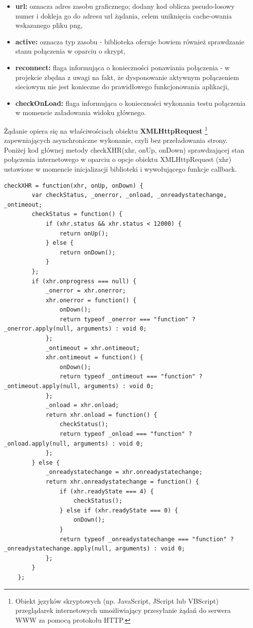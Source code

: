 \begin{itemize}
\item \textbf{url:} oznacza adres zasobu graficznego; dodany kod oblicza pseudo-losowy numer i dokleja go do adresu url żądania, celem uniknięcia cache-owania wskazanego pliku png,
\item \textbf{active:} oznacza typ zasobu - biblioteka oferuje bowiem również sprawdzanie stanu połączenia w oparciu o skrypt,
\item \textbf{reconnect:} flaga informująca o konieczności ponawiania połączenia - w projekcie zbędna z uwagi na fakt, że dysponowanie aktywnym połączeniem sieciowym nie jest konieczne do prawidłowego funkcjonowania aplikacji,
\item \textbf{checkOnLoad:} flaga informująca o konieczności wykonania testu połączenia w momencie załadowania widoku głównego.
\end{itemize}

Żądanie opiera się na właściwościach obiektu \textbf{XMLHttpRequest} \footnote{Obiekt języków skryptowych (np. JavaScript, JScript lub VBScript) przeglądarek internetowych umożliwiający przesyłanie żądań do serwera WWW za pomocą protokołu HTTP.} zapewniających asynchroniczne wykonanie, czyli bez przeładowania strony. Poniżej kod głównej metody checkXHR(xhr, onUp, onDown) sprawdzającej stan połączenia internetowego w oparciu o opcje obiektu XMLHttpRequest (xhr) ustawione w momencie inicjalizacji biblioteki i wywołującego funkcje callback.

\begin{lstlisting}[caption=Metoda checkXHR() wykonująca żądanie AJAX załadowania zasobu graficznego., label=amb, captionpos=b]
	checkXHR = function(xhr, onUp, onDown) {
        var checkStatus, _onerror, _onload, _onreadystatechange, _ontimeout;
        checkStatus = function() {
            if (xhr.status && xhr.status < 12000) {
                return onUp();
            } else {
                return onDown();
            }
        };
        if (xhr.onprogress === null) {
            _onerror = xhr.onerror;
            xhr.onerror = function() {
                onDown();
                return typeof _onerror === "function" ? _onerror.apply(null, arguments) : void 0;
            };
            _ontimeout = xhr.ontimeout;
            xhr.ontimeout = function() {
                onDown();
                return typeof _ontimeout === "function" ? _ontimeout.apply(null, arguments) : void 0;
            };
            _onload = xhr.onload;
            return xhr.onload = function() {
                checkStatus();
                return typeof _onload === "function" ? _onload.apply(null, arguments) : void 0;
            };
        } else {
            _onreadystatechange = xhr.onreadystatechange;
            return xhr.onreadystatechange = function() {
                if (xhr.readyState === 4) {
                    checkStatus();
                } else if (xhr.readyState === 0) {
                    onDown();
                }
                return typeof _onreadystatechange === "function" ? _onreadystatechange.apply(null, arguments) : void 0;
            };
        }
    };
\end{lstlisting}

